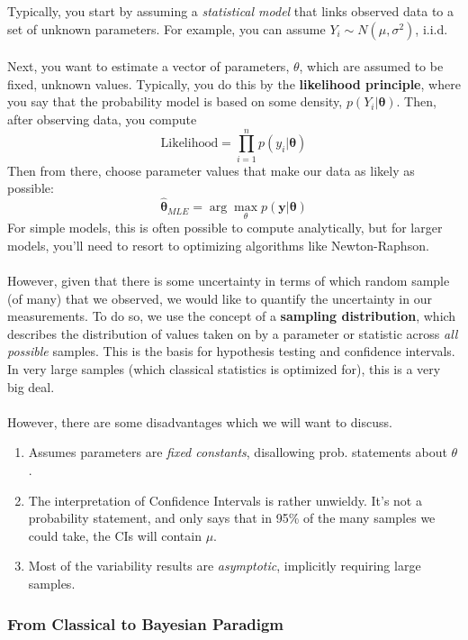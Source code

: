 \documentclass[12pt]{article}
\theoremstyle{plain}
\theoremstyle{definition}
\theoremstyle{remark}
\begin{document}
Typically, you start by assuming a \emph{statistical model} that links
observed data to a set of unknown parameters.  For example, you
can assume $Y_i \sim N(\mu,\sigma^2)$, i.i.d.
\\
\\
Next, you want to estimate a vector of parameters, $\mathbb{\theta}$,
which are assumed to be fixed, unknown values. Typically, you do this
by the \textbf{likelihood principle}, where you say that the probability
model is based on some density, $p(Y_i | \mathbf{\theta})$. Then, after
observing data, you compute
   \[ \text{Likelihood} = \prod^n_{i=1} p(y_i | \mathbf{\theta}) \]
Then from there, choose parameter values that make our data as
likely as possible:
   \[ \hat{\mathbf{\theta}}_{MLE} = \arg \max_{\mathbb{\theta}}
      p( \mathbf{y} | \mathbf{\theta}) \]
For simple models, this is often possible to compute analytically, but
for larger models, you'll need to resort to optimizing algorithms
like Newton-Raphson.
\\
\\
However, given that there is some uncertainty in terms of which
random sample (of many) that we observed, we would like to quantify
the uncertainty in our measurements.  To do so, we use the concept
of a \textbf{sampling distribution}, which describes the distribution
of values taken on by a parameter or statistic across \emph{all
possible} samples.  This is the basis for hypothesis testing and
confidence intervals.  In very large samples (which classical
statistics is optimized for), this is a very big deal.
\\
\\
However, there are some disadvantages which we will want to discuss.
\begin{enumerate}
   \item{Assumes parameters are \emph{fixed constants},
      disallowing prob. statements about $\theta$.}
   \item{The interpretation of Confidence Intervals is rather unwieldy.
      It's not a probability statement, and only says that in 95\%
      of the many samples we could take, the CIs will contain $\mu$.}
   \item{Most of the variability results are \emph{asymptotic},
      implicitly requiring large samples.}
\end{enumerate}

\subsubsection{From Classical to Bayesian Paradigm}
\end{document}
